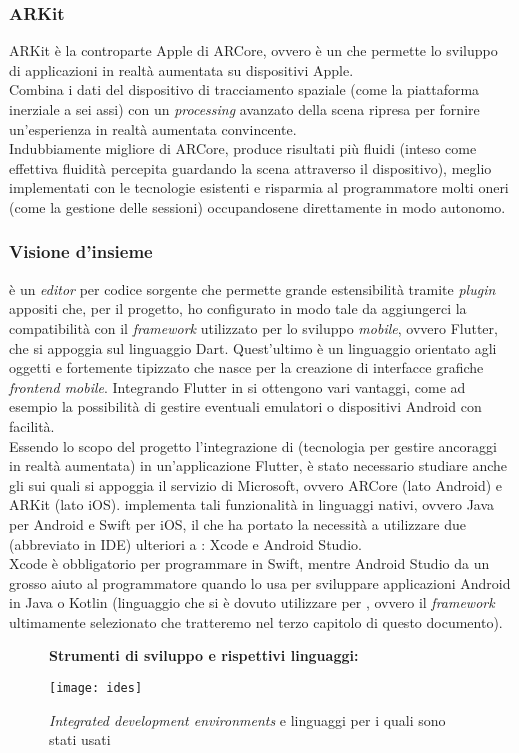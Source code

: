 \subsubsection{ARKit}
ARKit è la controparte Apple di ARCore, ovvero è un \sdk{} che permette lo sviluppo di applicazioni in realtà aumentata su dispositivi Apple.\\
Combina i dati del dispositivo di tracciamento spaziale (come la piattaforma inerziale a sei assi) con un \textit{processing} avanzato della scena ripresa per fornire un'esperienza in realtà aumentata convincente.\\
Indubbiamente migliore di ARCore, produce risultati più fluidi (inteso come effettiva fluidità percepita guardando la scena attraverso il dispositivo), meglio implementati con le tecnologie esistenti e risparmia al programmatore molti oneri (come la gestione delle sessioni) occupandosene direttamente in modo autonomo.

\subsubsection{Visione d'insieme}
\vsc{} è un \textit{editor} per codice sorgente che permette grande estensibilità tramite \textit{plugin} appositi che, per il progetto, ho configurato in modo tale da aggiungerci la compatibilità con il \textit{framework} utilizzato per lo sviluppo \textit{mobile}, ovvero Flutter, che si appoggia sul linguaggio Dart. Quest'ultimo è un linguaggio orientato agli oggetti e fortemente tipizzato che nasce per la creazione di interfacce grafiche \textit{frontend mobile}. Integrando Flutter in \vsc{} si ottengono vari vantaggi, come ad esempio la possibilità di gestire eventuali emulatori o dispositivi Android con facilità.\\
Essendo lo scopo del progetto l'integrazione di \asa{} (tecnologia per gestire ancoraggi in realtà aumentata) in un'applicazione Flutter, è stato necessario studiare anche gli \sdk{} sui quali si appoggia il servizio di Microsoft, ovvero ARCore (lato Android) e ARKit (lato iOS). \asa{} implementa tali funzionalità in linguaggi nativi, ovvero Java per Android e Swift per iOS, il che ha portato la necessità a utilizzare due \ide{}(abbreviato in IDE) ulteriori a \vsc{}: Xcode e Android Studio.\\
Xcode è obbligatorio per programmare in Swift, mentre Android Studio da un grosso aiuto al programmatore quando lo usa per sviluppare applicazioni Android in Java o Kotlin (linguaggio che si è dovuto utilizzare per \aplug{}, ovvero il \textit{framework} ultimamente selezionato che tratteremo nel terzo capitolo di questo documento).
\begin{figure}[H]
    \textbf{Strumenti di sviluppo e rispettivi linguaggi:}
    \begin{center}
    \texttt{[image: ides]}
    \caption{\textit{Integrated development environments} e linguaggi per i quali sono stati usati}
    \end{center}
\end{figure}

